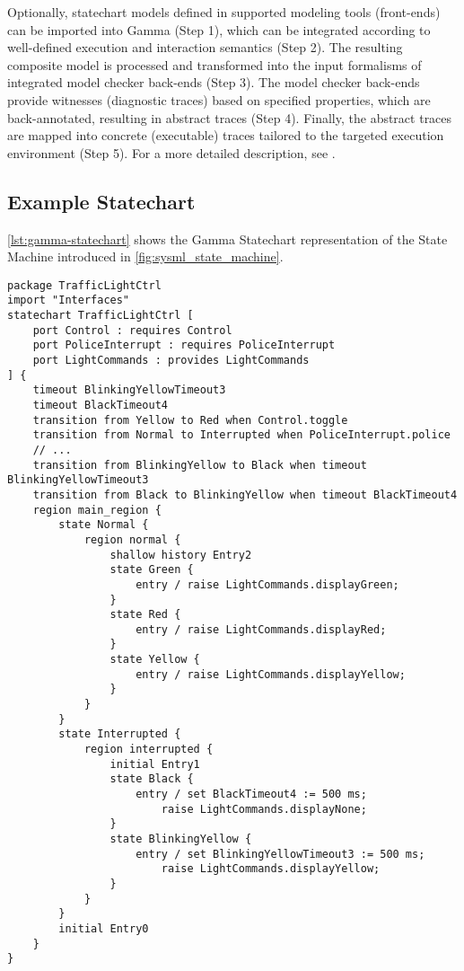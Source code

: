 Optionally, statechart models defined in supported modeling tools (front-ends) can be imported into Gamma (Step 1), which can be integrated according to well-defined execution and interaction semantics (Step 2). The resulting composite model is processed and transformed into the input formalisms of integrated model checker back-ends (Step 3). The model checker back-ends provide witnesses (diagnostic traces) based on specified properties, which are back-annotated, resulting in abstract traces (Step 4).
Finally, the abstract traces are mapped into concrete (executable) traces tailored to the targeted execution environment (Step 5). For a more detailed description, see \cite{mixed_statecharts_2020}.

\subsection{Example Statechart}

\autoref{lst:gamma-statechart} shows the Gamma Statechart representation of the State Machine introduced in \autoref{fig:sysml_state_machine}.

\begin{lstlisting}[float,language=statechart, caption={The traffic light controller state machine in the Gamma textual representation.}, label={lst:gamma-statechart}]
package TrafficLightCtrl
import "Interfaces"
statechart TrafficLightCtrl [
	port Control : requires Control
	port PoliceInterrupt : requires PoliceInterrupt
	port LightCommands : provides LightCommands
] {
	timeout BlinkingYellowTimeout3
	timeout BlackTimeout4
	transition from Yellow to Red when Control.toggle
	transition from Normal to Interrupted when PoliceInterrupt.police
	// ...
	transition from BlinkingYellow to Black when timeout BlinkingYellowTimeout3
	transition from Black to BlinkingYellow when timeout BlackTimeout4
	region main_region {
		state Normal {
			region normal {
				shallow history Entry2
				state Green {
					entry / raise LightCommands.displayGreen;
				}
				state Red {
					entry / raise LightCommands.displayRed;
				}
				state Yellow {
					entry / raise LightCommands.displayYellow;
				}
			}
		}
		state Interrupted {
			region interrupted {
				initial Entry1
				state Black {
					entry / set BlackTimeout4 := 500 ms; 
						raise LightCommands.displayNone;
				}
				state BlinkingYellow {
					entry / set BlinkingYellowTimeout3 := 500 ms; 
						raise LightCommands.displayYellow;
				}
			}
		}
		initial Entry0
	}
}
\end{lstlisting}